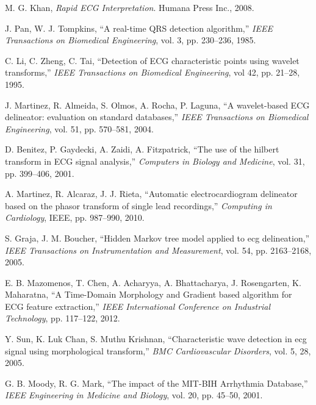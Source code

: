\documentclass[submitted]{ieeeaccess}
\begin{document}
\begin{thebibliography}{99}
	
	






	M. G. Khan,
	\emph{{R}apid ECG Interpretation}.
	Humana Press Inc., 2008.
	
	J. Pan, W. J. Tompkins,
	``{A} real-time QRS detection algorithm,''
	\emph{IEEE Transactions on Biomedical Engineering},
    vol. 3, pp. 230--236, 1985.
	
	C. Li, C. Zheng, C. Tai,
	``{D}etection of ECG characteristic points using wavelet transforms,'' 
	\emph{IEEE Transactions on Biomedical Engineering},
    vol 42, pp. 21--28, 1995.
	
	J. Martinez, R. Almeida, S. Olmos, A. Rocha, P. Laguna,
	``{A} wavelet-based ECG delineator: evaluation on standard databases,''
	\emph{IEEE Transactions on Biomedical Engineering},
    vol. 51, pp. 570--581, 2004.
    
	D. Benitez, P. Gaydecki, A. Zaidi, A. Fitzpatrick, 
	``{T}he use of the hilbert transform in ECG signal analysis,''
	\emph{Computers in Biology and Medicine}, vol. 31, pp. 399--406, 2001.
	
	A. Martinez, R. Alcaraz, J. J. Rieta, 
	``{A}utomatic electrocardiogram delineator based on the phasor transform of single lead recordings,''
	\emph{Computing in Cardiology}, IEEE, pp. 987--990, 2010.
	
	S. Graja, J. M. Boucher, 
	``{H}idden Markov tree model applied to ecg delineation,''
	\emph{IEEE Transactions on Instrumentation and Measurement},
    vol. 54, pp. 2163--2168, 2005.
	
	E. B. Mazomenos, T. Chen, A. Acharyya, A. Bhattacharya, J. Rosengarten, K. Maharatna,
	``{A} Time-Domain Morphology and Gradient based algorithm for ECG feature extraction,''
	\emph{IEEE International Conference on Industrial Technology}, pp. 117--122, 2012.
	
	Y. Sun, K. Luk Chan, S. Muthu Krishnan, 
	``{C}haracteristic wave detection in ecg signal using morphological transform,''
	\emph{BMC Cardiovascular Disorders}, vol. 5, 28, 2005.
	
	G. B. Moody, R. G. Mark, 
	``{T}he impact of the MIT-BIH Arrhythmia Database,''
	\emph{IEEE Engineering in Medicine and Biology}, vol. 20, pp. 45--50, 2001.
	

\end{thebibliography}
\end{document}
